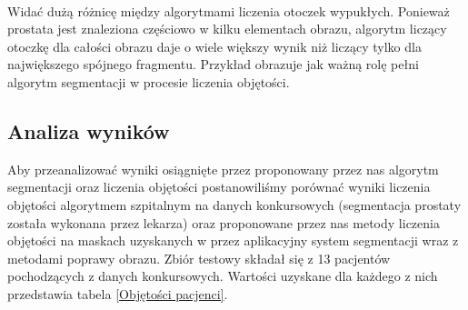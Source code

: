 \documentclass[a4paper,11pt,twoside]{report}
\theoremstyle{definition}
\begin{document}
\\
Widać dużą różnicę między algorytmami liczenia otoczek wypukłych. Ponieważ prostata jest znaleziona częściowo w kilku elementach obrazu, algorytm liczący otoczkę dla całości obrazu daje o wiele większy wynik niż liczący tylko dla największego spójnego fragmentu. Przykład obrazuje jak ważną rolę pełni algorytm segmentacji w procesie liczenia objętości.

\subsection{Analiza wyników}
Aby przeanalizować wyniki osiągnięte przez proponowany przez nas algorytm segmentacji oraz liczenia objętości postanowiliśmy porównać wyniki liczenia objętości algorytmem szpitalnym na danych konkursowych (segmentacja prostaty została wykonana przez lekarza) oraz proponowane przez nas metody liczenia objętości na maskach uzyskanych w przez aplikacyjny system segmentacji wraz z metodami poprawy obrazu. Zbiór testowy składał się z 13 pacjentów pochodzących z danych konkursowych. Wartości uzyskane dla każdego z nich przedstawia tabela \ref{Objętości pacjenci}.
\end{document}
